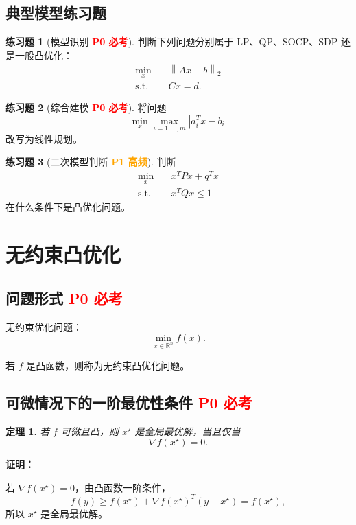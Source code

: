 \documentclass[11pt,a4paper]{ctexart}
\newcommand{\R}{\mathbb{R}}
\newcommand{\st}{\text{s.t.}}
\newcommand{\norm}[1]{\left\lVert #1 \right\rVert}
\newcommand{\Pzero}{\textcolor{red}{\textbf{P0 必考}}}
\newcommand{\Pone}{\textcolor{orange}{\textbf{P1 高频}}}
\theoremstyle{definition}
\newtheorem{exercise}{练习题}[section]
\theoremstyle{plain}
\newtheorem{theorem}{定理}[section]
\theoremstyle{remark}
\begin{document}
\subsection{典型模型练习题}

\begin{exercise}[模型识别 \Pzero]
判断下列问题分别属于 LP、QP、SOCP、SDP 还是一般凸优化：
\[
\begin{aligned}
    \min_x\quad & \norm{Ax-b}_2\\
    \st\quad & Cx=d.
\end{aligned}
\]
\end{exercise}

\begin{exercise}[综合建模 \Pzero]
将问题
\[
    \min_x \max_{i=1,\dots,m}|a_i^Tx-b_i|
\]
改写为线性规划。
\end{exercise}

\begin{exercise}[二次模型判断 \Pone]
判断
\[
\begin{aligned}
    \min_x\quad & x^TPx+q^Tx\\
    \st\quad & x^TQx\le1
\end{aligned}
\]
在什么条件下是凸优化问题。
\end{exercise}

\newpage

\section{无约束凸优化}

\subsection{问题形式 \Pzero}

无约束优化问题：
\[
    \min_{x\in\R^n} f(x).
\]

若 $f$ 是凸函数，则称为无约束凸优化问题。

\subsection{可微情况下的一阶最优性条件 \Pzero}

\begin{theorem}
若 $f$ 可微且凸，则 $x^\star$ 是全局最优解，当且仅当
\[
    \nabla f(x^\star)=0.
\]
\end{theorem}

\textbf{证明：}

若 $\nabla f(x^\star)=0$，由凸函数一阶条件，
\[
    f(y)\ge f(x^\star)+\nabla f(x^\star)^T(y-x^\star)
    =
    f(x^\star),
\]
所以 $x^\star$ 是全局最优解。
\end{document}
